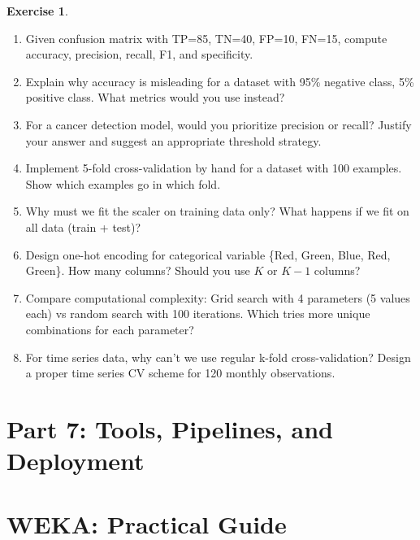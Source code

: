 \documentclass[11pt,twoside]{article}
\numberwithin{equation}{section}
\theoremstyle{plain}
\theoremstyle{definition}
\newtheorem{exercise}[theorem]{Exercise}
\theoremstyle{remark}
\begin{document}
\begin{exercise}
\begin{enumerate}
\item Given confusion matrix with TP=85, TN=40, FP=10, FN=15, compute accuracy, precision, recall, F1, and specificity.

\item Explain why accuracy is misleading for a dataset with 95\% negative class, 5\% positive class. What metrics would you use instead?

\item For a cancer detection model, would you prioritize precision or recall? Justify your answer and suggest an appropriate threshold strategy.

\item Implement 5-fold cross-validation by hand for a dataset with 100 examples. Show which examples go in which fold.

\item Why must we fit the scaler on training data only? What happens if we fit on all data (train + test)?

\item Design one-hot encoding for categorical variable \{Red, Green, Blue, Red, Green\}. How many columns? Should you use $K$ or $K-1$ columns?

\item Compare computational complexity: Grid search with 4 parameters (5 values each) vs random search with 100 iterations. Which tries more unique combinations for each parameter?

\item For time series data, why can't we use regular k-fold cross-validation? Design a proper time series CV scheme for 120 monthly observations.
\end{enumerate}
\end{exercise}

\section*{Part 7: Tools, Pipelines, and Deployment}

\section{WEKA: Practical Guide}
\label{sec:weka}
\end{document}
